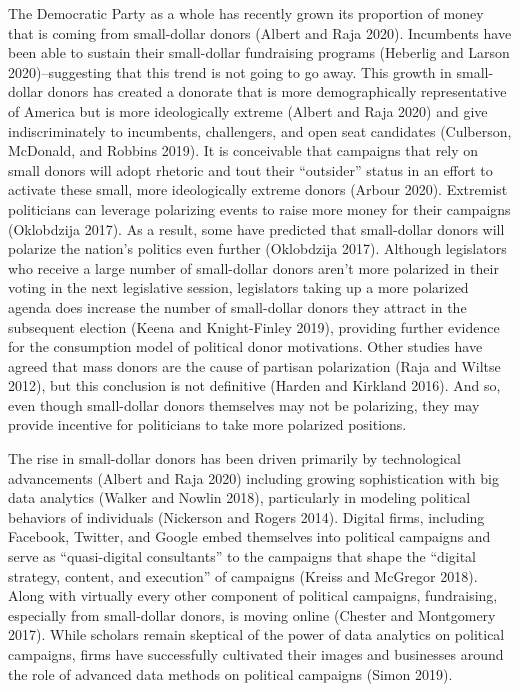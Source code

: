\documentclass[12pt,]{article}
\begin{document}
The Democratic Party as a whole has recently grown its proportion of
money that is coming from small-dollar donors (Albert and Raja 2020).
Incumbents have been able to sustain their small-dollar fundraising
programs (Heberlig and Larson 2020)--suggesting that this trend is not
going to go away. This growth in small-dollar donors has created a
donorate that is more demographically representative of America but is
more ideologically extreme (Albert and Raja 2020) and give
indiscriminately to incumbents, challengers, and open seat candidates
(Culberson, McDonald, and Robbins 2019). It is conceivable that
campaigns that rely on small donors will adopt rhetoric and tout their
``outsider'' status in an effort to activate these small, more
ideologically extreme donors (Arbour 2020). Extremist politicians can
leverage polarizing events to raise more money for their campaigns
(Oklobdzija 2017). As a result, some have predicted that small-dollar
donors will polarize the nation's politics even further (Oklobdzija
2017). Although legislators who receive a large number of small-dollar
donors aren't more polarized in their voting in the next legislative
session, legislators taking up a more polarized agenda does increase the
number of small-dollar donors they attract in the subsequent election
(Keena and Knight-Finley 2019), providing further evidence for the
consumption model of political donor motivations. Other studies have
agreed that mass donors are the cause of partisan polarization (Raja and
Wiltse 2012), but this conclusion is not definitive (Harden and Kirkland
2016). And so, even though small-dollar donors themselves may not be
polarizing, they may provide incentive for politicians to take more
polarized positions.

The rise in small-dollar donors has been driven primarily by
technological advancements (Albert and Raja 2020) including growing
sophistication with big data analytics (Walker and Nowlin 2018),
particularly in modeling political behaviors of individuals (Nickerson
and Rogers 2014). Digital firms, including Facebook, Twitter, and Google
embed themselves into political campaigns and serve as ``quasi-digital
consultants'' to the campaigns that shape the ``digital strategy,
content, and execution'' of campaigns (Kreiss and McGregor 2018). Along
with virtually every other component of political campaigns,
fundraising, especially from small-dollar donors, is moving online
(Chester and Montgomery 2017). While scholars remain skeptical of the
power of data analytics on political campaigns, firms have successfully
cultivated their images and businesses around the role of advanced data
methods on political campaigns (Simon 2019).
\end{document}
